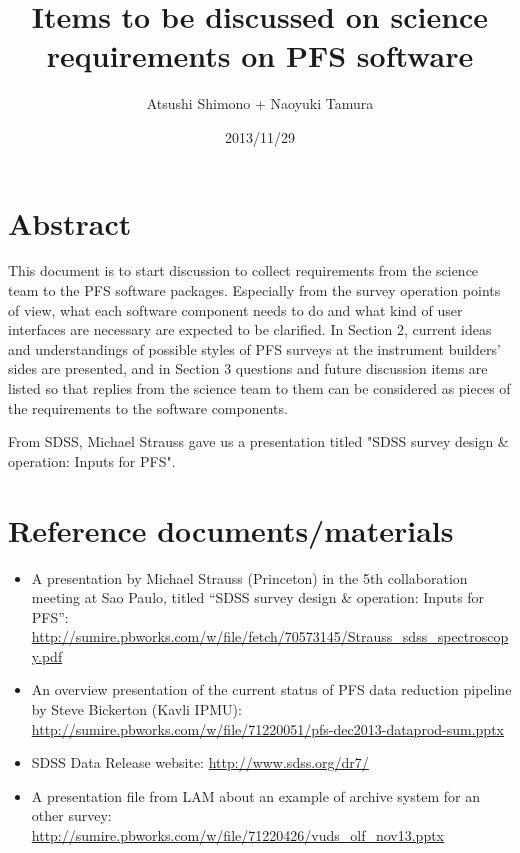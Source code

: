 \documentclass[a4paper,notitlepage]{article}
\title{Items to be discussed on science requirements on PFS software}
\author{Atsushi Shimono + Naoyuki Tamura}
\date{2013/11/29}
\begin{document}

\ssnhead

\section{Abstract}

This document is to start discussion to collect requirements from the
science team to the PFS software packages. Especially from the survey
operation points of view, what each software component needs to do and
what kind of user interfaces are necessary are expected to be
clarified. In Section 2, current ideas and understandings of possible
styles of PFS surveys at the instrument builders' sides are presented,
and in Section 3 questions and future discussion items are listed so
that replies from the science team to them can be considered as pieces
of the requirements to the software components.

From SDSS, Michael Strauss gave us a presentation titled "SDSS survey
design \& operation: Inputs for PFS".

\section{Reference documents/materials}

\begin{itemize}
 
 \item A presentation by Michael Strauss (Princeton) in the 5th
       collaboration meeting at Sao Paulo, titled ``SDSS survey
       design \& operation: Inputs for PFS'':
       \url{http://sumire.pbworks.com/w/file/fetch/70573145/Strauss_sdss_spectroscopy.pdf}
 \item An overview presentation of the current status of PFS data
       reduction pipeline by Steve Bickerton (Kavli IPMU): 
       \url{http://sumire.pbworks.com/w/file/71220051/pfs-dec2013-dataprod-sum.pptx}
 \item SDSS Data Release website: \url{http://www.sdss.org/dr7/}
 \item A presentation file from LAM about an example of archive system
       for an other survey: 
       \url{http://sumire.pbworks.com/w/file/71220426/vuds_olf_nov13.pptx}
\end{itemize}
\end{document}
